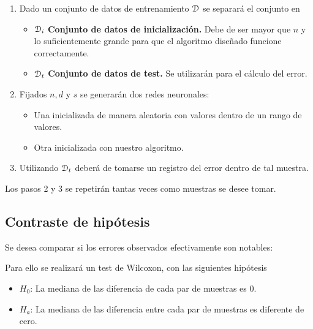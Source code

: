 \begin{enumerate}
\item Dado un conjunto de datos de entrenamiento $\mathcal{D}$  se separará el conjunto en
\begin{itemize}
    \item $\mathcal{D}_i$ \textbf{Conjunto de 
    datos de inicialización.} Debe de ser mayor que 
    $n$ y lo suficientemente grande para que el algoritmo diseñado funcione correctamente. 

    \item $\mathcal{D}_t$ \textbf{Conjunto de 
    datos de test.} Se utilizarán para el cálculo del error. 
\end{itemize}  

\item Fijados $n, d$ y $s$ se generarán dos redes neuronales: 

\begin{itemize}
    \item Una inicializada de manera aleatoria con valores dentro de un rango de valores. 
    
    \item  Otra inicializada con nuestro algoritmo. 
\end{itemize}

\item Utilizando $\mathcal{D}_t$ deberá de tomarse un registro del error dentro de tal muestra. 
\end{enumerate}

Los pasos 2 y 3 se repetirán tantas veces como 
muestras se desee tomar. 

\subsection{Contraste de hipótesis}

Se desea comparar si los errores observados efectivamente son notables: 

Para ello se realizará un test de Wilcoxon, con las siguientes hipótesis

\begin{itemize}
    \item $H_0$: La mediana de las diferencia de cada par de muestras es $0$. 
    \item $H_a$: La mediana de las diferencia entre cada par de muestras es diferente de cero. 
\end{itemize}

